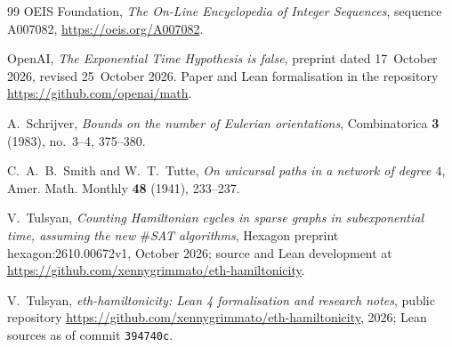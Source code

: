 \documentclass[10pt]{amsart}
\theoremstyle{plain}
\theoremstyle{definition}
\theoremstyle{remark}
\numberwithin{equation}{section}
\begin{document}
\begin{thebibliography}{99}
OEIS Foundation, \emph{The On-Line Encyclopedia of Integer Sequences}, sequence A007082,
\url{https://oeis.org/A007082}.

OpenAI, \emph{The {E}xponential {T}ime {H}ypothesis is false}, preprint dated 17~October 2026, revised
25~October 2026. Paper and Lean formalisation in the repository \url{https://github.com/openai/math}.

A.~Schrijver, \emph{Bounds on the number of {E}ulerian orientations}, Combinatorica \textbf{3}
(1983), no.~3--4, 375--380.

C.~A.~B.~Smith and W.~T.~Tutte, \emph{On unicursal paths in a network of degree $4$}, Amer. Math.
Monthly \textbf{48} (1941), 233--237.

V.~Tulsyan, \emph{Counting {H}amiltonian cycles in sparse graphs in subexponential time, assuming the
new $\#${SAT} algorithms}, Hexagon preprint hexagon:2610.00672v1, October 2026; source and Lean
development at \url{https://github.com/xennygrimmato/eth-hamiltonicity}.

V.~Tulsyan, \emph{eth-hamiltonicity: {L}ean 4 formalisation and research notes}, public repository
\url{https://github.com/xennygrimmato/eth-hamiltonicity}, 2026; Lean sources as of commit \texttt{394740c}.

\end{thebibliography}
\end{document}
